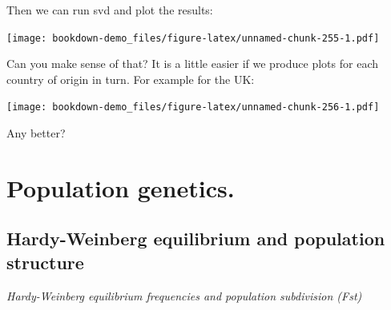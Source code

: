 \documentclass[
]{book}
\newenvironment{Shaded}{\begin{snugshade}}{\end{snugshade}}
\newcommand{\AttributeTok}[1]{\textcolor[rgb]{0.77,0.63,0.00}{#1}}
\newcommand{\DecValTok}[1]{\textcolor[rgb]{0.00,0.00,0.81}{#1}}
\newcommand{\FloatTok}[1]{\textcolor[rgb]{0.00,0.00,0.81}{#1}}
\newcommand{\FunctionTok}[1]{\textcolor[rgb]{0.00,0.00,0.00}{#1}}
\newcommand{\NormalTok}[1]{#1}
\newcommand{\OtherTok}[1]{\textcolor[rgb]{0.56,0.35,0.01}{#1}}
\newcommand{\SpecialCharTok}[1]{\textcolor[rgb]{0.00,0.00,0.00}{#1}}
\newcommand{\StringTok}[1]{\textcolor[rgb]{0.31,0.60,0.02}{#1}}
\begin{document}
Then we can run svd and plot the results:

\begin{Shaded}
\end{Shaded}

\texttt{[image: bookdown-demo\_files/figure-latex/unnamed-chunk-255-1.pdf]}

Can you make sense of that? It is a little easier if we produce plots for each country of origin in turn. For example for the UK:

\begin{Shaded}
\end{Shaded}

\texttt{[image: bookdown-demo\_files/figure-latex/unnamed-chunk-256-1.pdf]}

Any better?

\hypertarget{Population-genetics}{%
\chapter{Population genetics.}\label{Population-genetics}}

\hypertarget{hardy-weinberg-equilibrium-and-population-structure}{%
\section{Hardy-Weinberg equilibrium and population structure}\label{hardy-weinberg-equilibrium-and-population-structure}}

\emph{Hardy-Weinberg equilibrium frequencies and population subdivision (Fst)}
\end{document}
